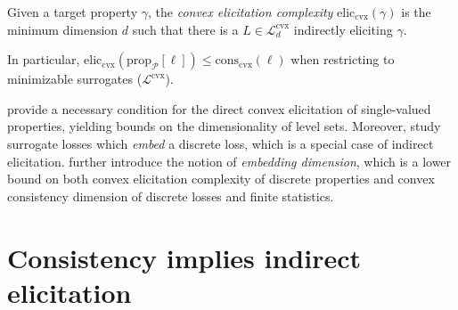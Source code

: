 \documentclass[anon,12pt]{colt2021} %
\newcommand{\Comments}{1}
\newcommand{\mytodo}[2]{\ifnum\Comments=1%
	\todo[linecolor=#1!80!black,backgroundcolor=#1,bordercolor=#1!80!black]{#2}\fi}
\newcommand{\btw}[1]{\mytodo{orange!80!white}{BTW: #1}}
\newcommand{\prop}[2][\mathcal{P}]{\mathrm{prop}_{#1}[#2]}
\newcommand{\eliccvx}{\mathrm{elic}_\mathrm{cvx}}
\newcommand{\conscvx}{\mathrm{cons}_\mathrm{cvx}}
\newcommand{\Lcvx}{\mathcal{L}^{\mathrm{cvx}}}
\begin{document}
\begin{definition}\label{def:cvx-elic-complex}
	Given a target property $\gamma$, the \emph{convex elicitation complexity} $\eliccvx(\gamma)$ is the minimum dimension $d$ such that there is a $L \in \Lcvx_d$ indirectly eliciting $\gamma$.
\end{definition}
In particular, $\eliccvx(\prop{\ell}) \leq \conscvx(\ell)$ when restricting to minimizable surrogates ($\Lcvx$).


\citet[Corollary 10]{agarwal2015consistent} provide a necessary condition for the direct convex elicitation of single-valued properties, yielding bounds on the dimensionality of level sets.
Moreover, \citet{finocchiaro2019embedding} study surrogate losses which \emph{embed} a discrete loss, which is a special case of indirect elicitation.
\citet{finocchiaro2020embedding} further introduce the notion of \emph{embedding dimension}, which is a lower bound on both convex elicitation complexity of discrete properties and convex consistency dimension of discrete losses and finite statistics.


\section{Consistency implies indirect elicitation}\label{sec:consis-implies-indir}
\end{document}
